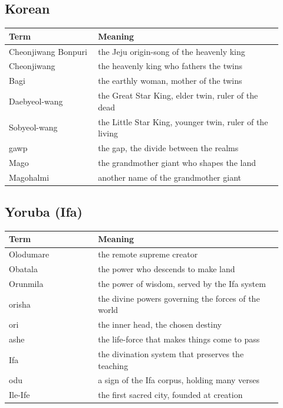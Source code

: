 \subsection{Korean}

\begin{longtable}{L{0.30\linewidth} L{0.62\linewidth}}
\toprule
\textbf{Term} & \textbf{Meaning} \\
\midrule
\endhead
Cheonjiwang Bonpuri & the Jeju origin-song of the heavenly king \\
Cheonjiwang & the heavenly king who fathers the twins \\
Bagi & the earthly woman, mother of the twins \\
Daebyeol-wang & the Great Star King, elder twin, ruler of the dead \\
Sobyeol-wang & the Little Star King, younger twin, ruler of the living \\
gawp & the gap, the divide between the realms \\
Mago & the grandmother giant who shapes the land \\
Magohalmi & another name of the grandmother giant \\
\bottomrule
\end{longtable}

\subsection{Yoruba (Ifa)}

\begin{longtable}{L{0.30\linewidth} L{0.62\linewidth}}
\toprule
\textbf{Term} & \textbf{Meaning} \\
\midrule
\endhead
Olodumare & the remote supreme creator \\
Obatala & the power who descends to make land \\
Orunmila & the power of wisdom, served by the Ifa system \\
orisha & the divine powers governing the forces of the world \\
ori & the inner head, the chosen destiny \\
ashe & the life-force that makes things come to pass \\
Ifa & the divination system that preserves the teaching \\
odu & a sign of the Ifa corpus, holding many verses \\
Ile-Ife & the first sacred city, founded at creation \\
\bottomrule
\end{longtable}

